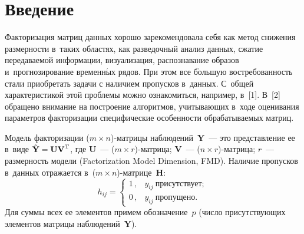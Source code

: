 
  
\vspace*{3pt}



\thispagestyle{headings}

\begin{multicols}{2}

\label{st\stat}

\section{Введение}

     Факторизация матриц данных хорошо зарекомендовала себя как метод 
снижения размерности в~таких областях, как разведочный анализ данных, 
сжатие передаваемой информации, визуализация, распознавание образов 
и~прогнозирование временн$\acute{\mbox{ы}}$х рядов. При этом все б$\acute{\mbox{о}}$льшую востребованность 
стали приобретать задачи с наличием пропусков в~данных. С~общей 
характеристикой этой проблемы можно ознакомиться, например, в~[1]. В~[2] 
обращено внимание на построение алгоритмов, учитывающих в~ходе 
оценивания параметров факторизации специфические особенности 
обрабатываемых матриц.
     
     Модель факторизации ($m\times n$)-мат\-ри\-цы 
наблюдений~$\mathbf{Y}$~--- это представление ее в~виде 
$\tilde{\mathbf{Y}}\hm= \mathbf{UV}^{\mathrm{T}}$, где $\mathbf{U}$~--- 
($m\times r$)-мат\-ри\-ца; $\mathbf{V}$~--- ($n\times r$)-мат\-ри\-ца; $r$~--- 
размерность модели (Factorization Model Dimension, FMD). Наличие пропусков 
в~данных отражается в~($m\times n$)-мат\-ри\-це~$\mathbf{H}$:
     $$
     h_{ij}= \begin{cases}
     1\,, & y_{ij}\ \mbox{присутствует};\\
     0\,, & y_{ij}\ \mbox{пропущено}.
     \end{cases}
     $$
Для суммы всех ее элементов примем обозначение~$p$ (число 
присутствующих элементов матрицы наблюдений~$\mathbf{Y}$).


\end{multicols}
